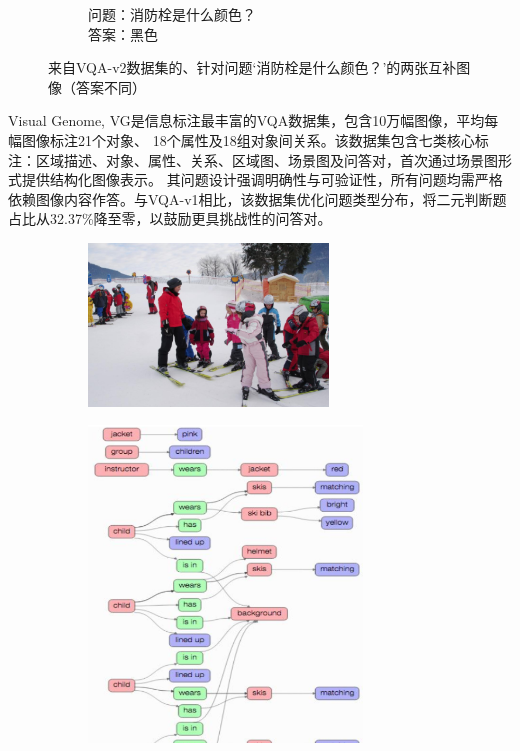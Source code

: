 \begin{figure}[h]
\begin{subfigure}[b]{0.45\textwidth}
        \caption*{\footnotesize 问题：消防栓是什么颜色？\\答案：黑色}
        \label{fig:example-from-vqa-v2-2}
    \end{subfigure}
    \caption{来自VQA-v2数据集的、针对问题‘消防栓是什么颜色？’的两张互补图像（答案不同）}
    \label{fig:example-from-vqa-v2}
\end{figure}

Visual Genome, VG​\cite{krishna2017visual}是信息标注最丰富的VQA数据集，包含10万幅图像，平均每幅图像标注21个对象、
18个属性及18组对象间关系。该数据集包含七类核心标注：区域描述、对象、属性、关系、区域图、场景图及问答对，首次通过场景图形式提供结构化图像表示。
其问题设计强调明确性与可验证性，所有问题均需严格依赖图像内容作答。与VQA-v1相比，该数据集优化问题类型分布，将二元判断题占比从32.37\%降至零，以鼓励更具挑战性的问答对。
\begin{figure}[htbp]
    \centering
    \begin{subfigure}[b]{0.45\textwidth}
        \centering
        \includegraphics[width=0.7\textwidth, keepaspectratio]{figures/visual-genome-a.png}
    \end{subfigure}
    \hfill
    \begin{subfigure}[b]{0.45\textwidth}
        \centering
        \includegraphics[width=0.8\textwidth, keepaspectratio]{figures/visual-genome-b.png}

\end{subfigure}
\end{figure}
